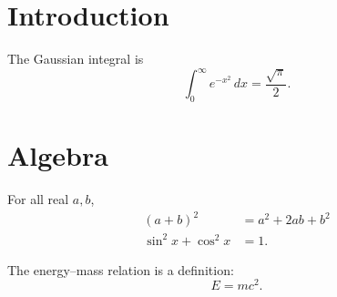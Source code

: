 \documentclass{article}
\begin{document}
\section{Introduction}
The Gaussian integral is
\begin{equation}
\label{eq:gauss}
\int_0^\infty e^{-x^2}\,dx = \frac{\sqrt{\pi}}{2}.
\end{equation}

\section{Algebra}
For all real $a,b$,
\begin{align}
(a+b)^2 &= a^2 + 2ab + b^2 \label{eq:binom}\\
\sin^2 x + \cos^2 x &= 1.
\end{align}

The energy--mass relation is a definition:
\[
E = mc^2.
\]
\end{document}
